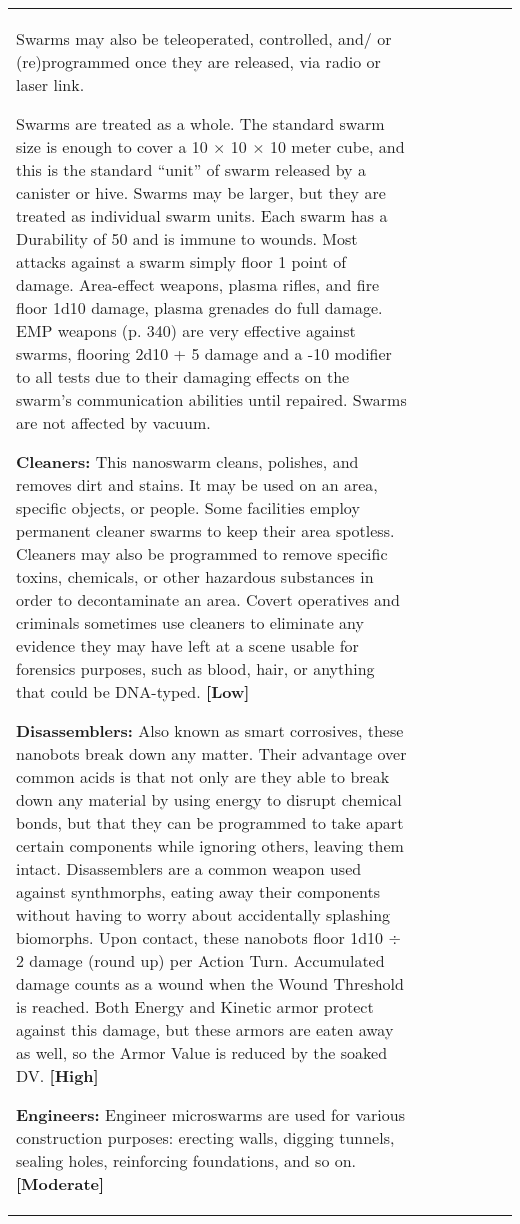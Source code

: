 \begin{tabular}{|l|l|l|l|l|l|l|}
Swarms may also be teleoperated, controlled, and/ or (re)programmed once they are released, via radio or laser link. 

Swarms are treated as a whole. The standard swarm size is enough to cover a 10 $\times$ 10 $\times$ 10 meter cube, and this is the standard ``unit'' of swarm released by a canister or hive. Swarms may be larger, but they are treated as individual swarm units. Each swarm has a Durability of 50 and is immune to wounds. Most attacks against a swarm simply floor 1 point of damage. Area-effect weapons, plasma rifles, and fire floor 1d10 damage, plasma grenades do full damage. EMP weapons (p. 340) are very effective against swarms, flooring 2d10 + 5 damage and a -10 modifier to all tests due to their damaging effects on the swarm’s communication abilities until repaired. Swarms are not affected by vacuum. 

\textbf{Cleaners:} This nanoswarm cleans, polishes, and removes dirt and stains. It may be used on an area, specific objects, or people. Some facilities employ permanent cleaner swarms to keep their area spotless. Cleaners may also be programmed to remove specific toxins, chemicals, or other hazardous substances in order to decontaminate an area. Covert operatives and criminals sometimes use cleaners to eliminate any evidence they may have left at a scene usable for forensics purposes, such as blood, hair, or anything that could be DNA-typed. \textbf{[Low]} 

\textbf{Disassemblers:} Also known as smart corrosives, these nanobots break down any matter. Their advantage over common acids is that not only are they able to break down any material by using energy to disrupt chemical bonds, but that they can be programmed to take apart certain components while ignoring others, leaving them intact. Disassemblers are a common weapon used against synthmorphs, eating away their components without having to worry about accidentally splashing biomorphs. Upon contact, these nanobots floor 1d10 $\div$ 2 damage (round up) per Action Turn. Accumulated damage counts as a wound when the Wound Threshold is reached. Both Energy and Kinetic armor protect against this damage, but these armors are eaten away as well, so the Armor Value is reduced by the soaked DV. \textbf{[High]} 

\textbf{Engineers:} Engineer microswarms are used for various construction purposes: erecting walls, digging tunnels, sealing holes, reinforcing foundations, and so on. \textbf{[Moderate]} 


\end{tabular}
